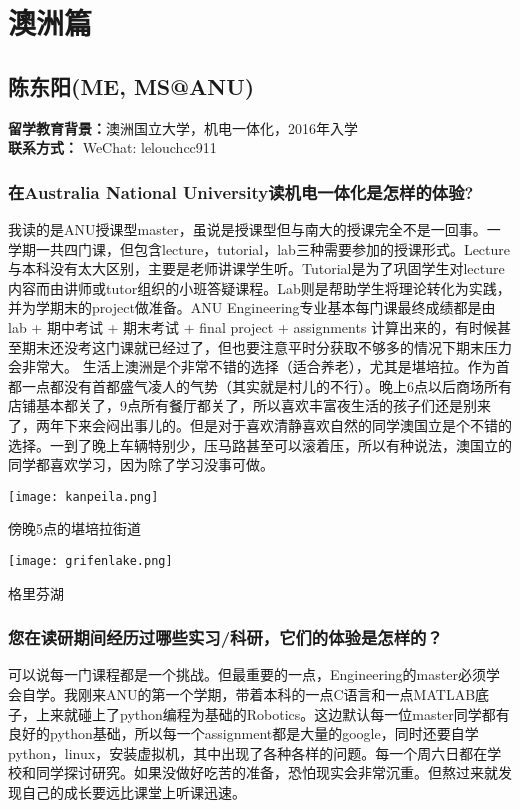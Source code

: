 \documentclass[a4paper,UTF8]{book}
\begin{document}
\clearpage
\section{澳洲篇}

\subsection{陈东阳(ME, MS@ANU)}
    \textbf{留学教育背景：}澳洲国立大学，机电一体化，2016年入学\\
    \textbf{联系方式：} WeChat: lelouchcc911

    \subsubsection*{在Australia National University读机电一体化是怎样的体验?}
    我读的是ANU授课型master，虽说是授课型但与南大的授课完全不是一回事。一学期一共四门课，但包含lecture，tutorial，lab三种需要参加的授课形式。Lecture与本科没有太大区别，主要是老师讲课学生听。Tutorial是为了巩固学生对lecture内容而由讲师或tutor组织的小班答疑课程。Lab则是帮助学生将理论转化为实践，并为学期末的project做准备。ANU Engineering专业基本每门课最终成绩都是由lab + 期中考试 + 期末考试 + final project + assignments 计算出来的，有时候甚至期末还没考这门课就已经过了，但也要注意平时分获取不够多的情况下期末压力会非常大。
    生活上澳洲是个非常不错的选择（适合养老），尤其是堪培拉。作为首都一点都没有首都盛气凌人的气势（其实就是村儿的不行）。晚上6点以后商场所有店铺基本都关了，9点所有餐厅都关了，所以喜欢丰富夜生活的孩子们还是别来了，两年下来会闷出事儿的。但是对于喜欢清静喜欢自然的同学澳国立是个不错的选择。一到了晚上车辆特别少，压马路甚至可以滚着压，所以有种说法，澳国立的同学都喜欢学习，因为除了学习没事可做。 
    \vspace{3ex}

    \centerline{\texttt{[image: kanpeila.png]}}
    \centerline{傍晚5点的堪培拉街道}
    \centerline{\texttt{[image: grifenlake.png]}}
    \centerline{格里芬湖}
    \subsubsection*{您在读研期间经历过哪些实习/科研，它们的体验是怎样的？}
    可以说每一门课程都是一个挑战。但最重要的一点，Engineering的master必须学会自学。我刚来ANU的第一个学期，带着本科的一点C语言和一点MATLAB底子，上来就碰上了python编程为基础的Robotics。这边默认每一位master同学都有良好的python基础，所以每一个assignment都是大量的google，同时还要自学python，linux，安装虚拟机，其中出现了各种各样的问题。每一个周六日都在学校和同学探讨研究。如果没做好吃苦的准备，恐怕现实会非常沉重。但熬过来就发现自己的成长要远比课堂上听课迅速。
\end{document}
